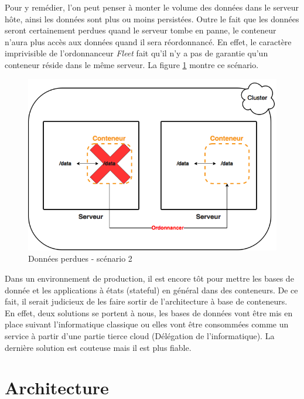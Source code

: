 \begin{onehalfspace}
Pour y remédier, l'on peut penser à monter le volume des données dans le serveur hôte, ainsi les données sont plus ou moins persistées. Outre le fait que les données seront certainement perdues quand le serveur tombe en panne, le conteneur n'aura plus accès aux données quand il sera réordonnancé. En effet, le caractère imprivisible de l'ordonnanceur \emph{Fleet} fait qu'il n'y a pas de garantie qu'un conteneur réside dans le même serveur. La figure \ref{fig:database2} montre ce scénario.

\begin{figure}[H]
\centering
\includegraphics [scale=0.5]{chapitre4/assets/database2}
\caption{Données perdues - scénario 2}
\label{fig:database2}
\end{figure}


Dans un environnement de production, il est encore tôt pour mettre les bases de donnée et les applications à états (stateful) en général dans des conteneurs. De ce fait, il serait judicieux de les faire sortir de l'architecture à base de conteneurs. En effet, deux solutions se portent à nous, les bases de données vont être mis en place suivant l'informatique classique ou elles vont être consommées comme un service à partir d'une partie tierce cloud (Délégation de l'informatique). La dernière solution est couteuse mais il est plus fiable.



\section{Architecture}


\end{onehalfspace}

